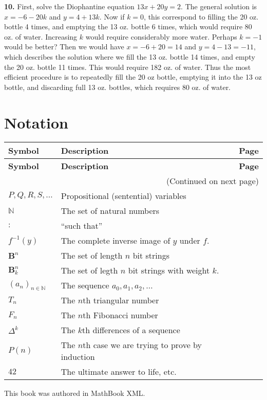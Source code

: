 \documentclass[10pt,]{book}
\theoremstyle{plain}
\theoremstyle{definition}
\theoremstyle{definition}
\theoremstyle{definition}
\numberwithin{equation}{chapter}
\def\N{\mathbb N}
\def\B{\mathbf{B}}
\def\inv{^{-1}}
\def\st{:}
\begin{document}
\par\smallskip
\noindent\textbf{10.}\quad{}
First, solve the Diophantine equation \(13x + 20 y = 2\). The general solution is \(x = -6 - 20k\) and \(y = 4+13k\). Now if \(k = 0\), this correspond to filling the 20 oz. bottle 4 times, and emptying the 13 oz. bottle 6 times, which would require 80 oz. of water. Increasing \(k\) would require considerably more water. Perhaps \(k = -1\) would be better? Then we would have \(x = -6+20 = 14\) and \(y = 4-13 = -11\), which describes the solution where we fill the 13 oz. bottle 14 times, and empty the 20 oz. bottle 11 times. This would require 182 oz. of water. Thus the most efficient procedure is to repeatedly fill the 20 oz bottle, emptying it into the 13 oz bottle, and discarding full 13 oz. bottles, which requires 80 oz. of water.
%
\par\smallskip
\typeout{************************************************}
\typeout{************************************************}
\chapter[Notation]{Notation}\label{appendix-2}
\begin{longtable}[l]{llr}
\textbf{Symbol}&\textbf{Description}&\textbf{Page}\\[1em]
\endfirsthead
\textbf{Symbol}&\textbf{Description}&\textbf{Page}\\[1em]
\endhead
\multicolumn{3}{r}{(Continued on next page)}\\
\endfoot
\endlastfoot
$
                    P, Q, R, S, \ldots
                $&Propositional (sentential) variables&\pageref{notation-1}\\
$\N$&The set of natural numbers&\pageref{notation-2}\\
$\st$&``such that''&\pageref{notation-3}\\
$f\inv(y)$&The complete inverse image of \(y\) under \(f\).&\pageref{notation-4}\\
$\B^n$&The set of length \(n\) bit strings&\pageref{notation-5}\\
$\B^n_k$&The set of legth \(n\) bit strings with weight \(k\).&\pageref{notation-6}\\
$(a_n)_{n \in \N}$&The sequence \(a_0, a_1, a_2, \ldots\)&\pageref{notation-7}\\
$T_n$&The \(n\)th triangular number&\pageref{notation-8}\\
$F_n$&The \(n\)th Fibonacci number&\pageref{notation-9}\\
$\Delta^k$&The \(k\)th differences of a sequence&\pageref{notation-10}\\
$P(n)$&The \(n\)th case we are trying to prove by induction&\pageref{notation-11}\\
$42$&The ultimate answer to life, etc.&\pageref{notation-12}\\
\end{longtable}
%
\backmatter
%
%
\printindex
%
\cleardoublepage
\pagestyle{empty}
\centerline{
    This book was authored in MathBook XML.
}
\end{document}

